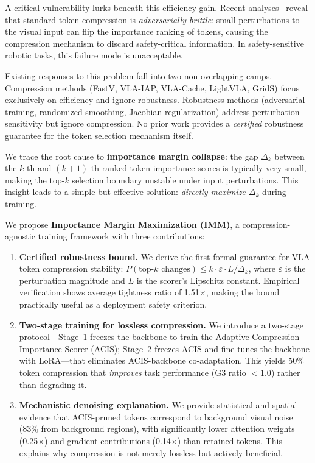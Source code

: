 \documentclass[10pt,twocolumn]{article}
\newcommand{\dk}{\Delta_k}
\newcommand{\eps}{\varepsilon}
\begin{document}
A critical vulnerability lurks beneath this efficiency gain.
Recent analyses~\cite{lessismore2025,cage2026} reveal that standard token compression is \emph{adversarially brittle}: small perturbations to the visual input can flip the importance ranking of tokens, causing the compression mechanism to discard safety-critical information.
In safety-sensitive robotic tasks, this failure mode is unacceptable.

Existing responses to this problem fall into two non-overlapping camps.
Compression methods (FastV, VLA-IAP, VLA-Cache, LightVLA, GridS) focus exclusively on efficiency and ignore robustness.
Robustness methods (adversarial training, randomized smoothing, Jacobian regularization) address perturbation sensitivity but ignore compression.
No prior work provides a \emph{certified} robustness guarantee for the token selection mechanism itself.

We trace the root cause to \textbf{importance margin collapse}: the gap $\dk$ between the $k$-th and $(k+1)$-th ranked token importance scores is typically very small, making the top-$k$ selection boundary unstable under input perturbations.
This insight leads to a simple but effective solution: \emph{directly maximize $\dk$} during training.

We propose \textbf{Importance Margin Maximization (IMM)}, a compression-agnostic training framework with three contributions:
\begin{enumerate}
    \item \textbf{Certified robustness bound.} We derive the first formal guarantee for VLA token compression stability: $P(\text{top-}k \text{ changes}) \leq k \cdot \eps \cdot L / \dk$, where $\eps$ is the perturbation magnitude and $L$ is the scorer's Lipschitz constant. Empirical verification shows average tightness ratio of 1.51$\times$, making the bound practically useful as a deployment safety criterion.
    \item \textbf{Two-stage training for lossless compression.} We introduce a two-stage protocol---Stage~1 freezes the backbone to train the Adaptive Compression Importance Scorer (ACIS); Stage~2 freezes ACIS and fine-tunes the backbone with LoRA---that eliminates ACIS-backbone co-adaptation. This yields 50\% token compression that \emph{improves} task performance (G3 ratio $< 1.0$) rather than degrading it.
    \item \textbf{Mechanistic denoising explanation.} We provide statistical and spatial evidence that ACIS-pruned tokens correspond to background visual noise (83\% from background regions), with significantly lower attention weights (0.25$\times$) and gradient contributions (0.14$\times$) than retained tokens. This explains why compression is not merely lossless but actively beneficial.
\end{enumerate}
\end{document}
